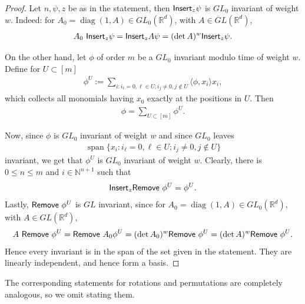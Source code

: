 \documentclass{scrartcl}
\theoremstyle{plain}
\theoremstyle{definition}
\newcommand{\R}{\mathbb{R}}
\newcommand{\N}{\mathbb{N}}
\newcommand{\1}[1]{1_{\{#1\}}}
\newcommand{\ds}{d} %
\begin{document}
\begin{proof}
  Let $n, \psi, z$ be as in the statement,
  then $\mathsf{Insert}_z \psi$ is $GL_0$ invariant of weight $w$.
  Indeed:
  for $A_0 = \operatorname{diag}(1, A) \in GL_0(\R^\ds)$, with $A \in GL(\R^\ds)$,
  \begin{align*}
    A_0\ \mathsf{Insert}_z \psi
    =
    \mathsf{Insert}_z A \psi
    =
    (\det A)^w \mathsf{Insert}_z \psi.
  \end{align*}

  On the other hand,
  let $\phi$ of order $m$ be a $GL_0$ invariant modulo time of weight $w$.
  Define for $U \subset [m]$
  \begin{align*}
    \phi^U := \sum_{i : i_\ell = 0, \ell \in U; i_j \not= 0, j \not\in U} \langle \phi, x_i \rangle x_i,
  \end{align*}
  which collects all monomials having $x_0$ exactly at the positions in $U$.
  Then
  \begin{align*}
    \phi = \sum_{U \subset [m]} \phi^U.
  \end{align*}

  Now, since $\phi$ is $GL_0$ invariant of weight $w$
  and since $GL_0$ leaves
  \begin{align*}
    \operatorname{span} \{ x_i : i_\ell = 0, \ell \in U; i_j \not= 0, j \not\in U \}
  \end{align*}
  invariant, we get that $\phi^U$ is $GL_0$ invariant of weight $w$.
  Clearly, there is $0 \le n \le m$ and $i \in \N^{n+1}$ such that
  \begin{align*}
    \mathsf{Insert}_z \mathsf{Remove\ } \phi^U = \phi^U.
  \end{align*}
  Lastly, $\mathsf{Remove\ } \phi^U$ is $GL$ invariant,
  since for $A_0 = \operatorname{diag}(1, A) \in GL_0(\R^\ds)$, with $A \in GL(\R^\ds)$,
  \begin{align*}
    A \ \mathsf{Remove\ } \phi^U = \mathsf{Remove\ } A_0 \phi^U = (\det A_0)^w \mathsf{Remove\ } \phi^U = (\det A)^w \mathsf{Remove\ } \phi^U.
  \end{align*}
  Hence every invariant is in the span of the set given in the statement.
  They are linearly independent, and hence form a basis.
\end{proof}

The corresponding statements for rotations and permutations are completely analogous, so we omit stating them.
\end{document}
